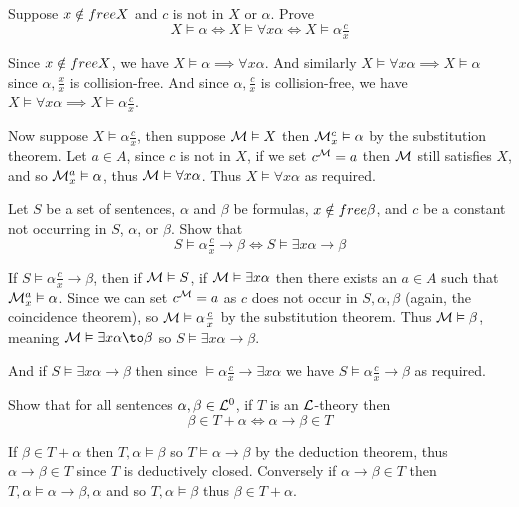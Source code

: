 \bexerc

    Suppose $x\notin{\sl free} X$ and $c$ is not in $X$ or $\alpha$.
    Prove
    $$ X\vDash\alpha \iff X\vDash\forall x\alpha \iff X\vDash\alpha\tfrac cx $$

\eexerc

Since $x\notin{\sl free} X$, we have $X\vDash\alpha\implies\forall x\alpha$.
And similarly $X\vDash\forall x\alpha\implies X\vDash\alpha$ since $\alpha,\frac xx$ is collision-free.
And since $\alpha,\frac cx$ is collision-free, we have $X\vDash\forall x\alpha\implies X\vDash\alpha\tfrac cx$.

Now suppose $X\vDash\alpha\tfrac cx$, then suppose ${\cal M}\vDash X$ then ${\cal M}^c_x\vDash\alpha$ by the substitution theorem.
Let $a\in A$, since $c$ is not in $X$, if we set $c^{\cal M}=a$ then ${\cal M}$ still satisfies $X$, and so ${\cal M}^a_x\vDash\alpha$, thus ${\cal M}\vDash\forall x\alpha$.
Thus $X\vDash\forall x\alpha$ as required.

\bexerc

    Let $S$ be a set of sentences, $\alpha$ and $\beta$ be formulas, $x\notin{\sl free}\beta$, and $c$ be a constant not occurring in $S$, $\alpha$, or $\beta$.
    Show that
    $$ S\vDash\alpha\tfrac cx\to\beta \iff S\vDash\exists x\alpha\to\beta $$

\eexerc

If $S\vDash\alpha\tfrac cx\to\beta$, then if ${\cal M}\vDash S$, if ${\cal M}\vDash\exists x\alpha$ then there exists an $a\in A$ such that ${\cal M}^a_x\vDash\alpha$.
Since we can set $c^{\cal M}=a$ as $c$ does not occur in $S,\alpha,\beta$ (again, the coincidence theorem), so ${\cal M}\vDash\alpha\tfrac cx$ by the substitution theorem.
Thus ${\cal M}\vDash\beta$, meaning ${\cal M}\vDash\exists x\alpha\to\beta$ so $S\vDash\exists x\alpha\to\beta$.

And if $S\vDash\exists x\alpha\to\beta$ then since $\vDash\alpha\tfrac cx\to\exists x\alpha$ we have $S\vDash\alpha\tfrac cx\to\beta$ as required.

\bexerc

    Show that for all sentences $\alpha,\beta\in{\cal L}^0$, if $T$ is an ${\cal L}$-theory then
    $$ \beta\in T+\alpha \iff \alpha\to\beta \in T $$

\eexerc

If $\beta\in T+\alpha$ then $T,\alpha\vDash\beta$ so $T\vDash\alpha\to\beta$ by the deduction theorem, thus $\alpha\to\beta\in T$ since $T$ is deductively closed.
Conversely if $\alpha\to\beta\in T$ then $T,\alpha\vDash\alpha\to\beta,\alpha$ and so $T,\alpha\vDash\beta$ thus $\beta\in T+\alpha$.

